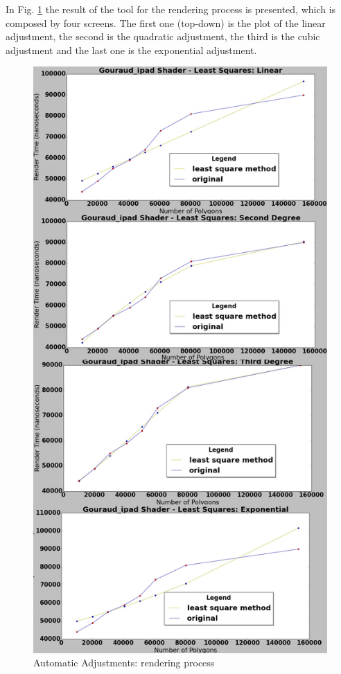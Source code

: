 \documentclass[10pt, conference, compsocconf]{IEEEtran}
\begin{document}
{ In Fig. \ref{tool_result} the result of the tool for
the rendering process is presented, which is composed by four screens. 
The first one (top-down) is the plot of the linear adjustment, the second 
is the quadratic adjustment, the third is  the cubic  
adjustment and the last one is the exponential adjustment. 

	\begin{figure}[!t]
	\centering
		\includegraphics[keepaspectratio=true,scale=0.23]{ios_minquad_render.jpg}
	\caption{Automatic Adjustments: rendering process}
	\label{tool_result}
	\end{figure}

}
\end{document}
